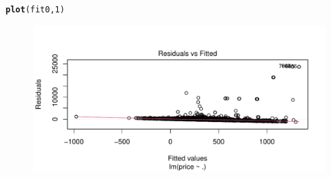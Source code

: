 \documentclass[justified, 11pt]{scrartcl}\usepackage[]{graphicx}\usepackage[]{xcolor}
\makeatletter
\def\maxwidth{ %
  \ifdim\Gin@nat@width>\linewidth
    \linewidth
  \else
    \Gin@nat@width
  \fi
}
\newcommand{\hlnum}[1]{\textcolor[rgb]{0.686,0.059,0.569}{#1}}%
\newcommand{\hlstd}[1]{\textcolor[rgb]{0.345,0.345,0.345}{#1}}%
\newcommand{\hlkwd}[1]{\textcolor[rgb]{0.737,0.353,0.396}{\textbf{#1}}}%
\newenvironment{kframe}{%
 \def\at@end@of@kframe{}%
 \ifinner\ifhmode%
  \def\at@end@of@kframe{\end{minipage}}%
  \begin{minipage}{\columnwidth}%
 \fi\fi%
 \def\FrameCommand##1{\hskip\@totalleftmargin \hskip-\fboxsep
 \colorbox{shadecolor}{##1}\hskip-\fboxsep
     \hskip-\linewidth \hskip-\@totalleftmargin \hskip\columnwidth}%
 \MakeFramed {\advance\hsize-\width
   \@totalleftmargin\z@ \linewidth\hsize
   \@setminipage}}%
 {\par\unskip\endMakeFramed%
 \at@end@of@kframe}
\newenvironment{knitrout}{}{} %
\makeatother
\begin{document}
\begin{knitrout}
\begin{kframe}\begin{alltt}
\hlkwd{plot}\hlstd{(fit0,} \hlnum{1}\hlstd{)}
\end{alltt}
\end{kframe}\begin{figure}
\includegraphics[width=\maxwidth]{figure/chunk-fit0-1} \end{figure}

\end{knitrout}



{}

\end{document}
